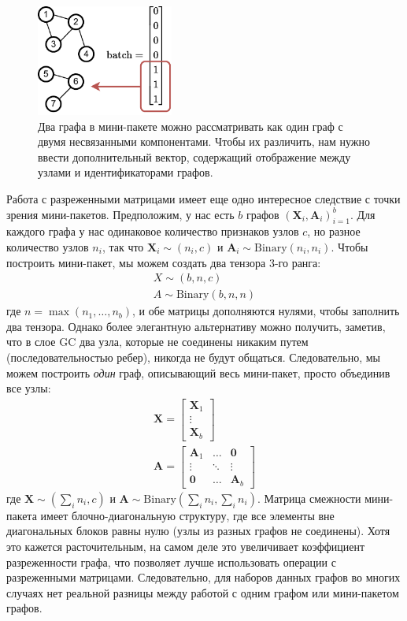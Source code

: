 \begin{figure}
    \centering
    \hspace{2em}\includegraphics[width=0.4\textwidth]{images/graphs-Page-4}
    \caption{Два графа в мини-пакете можно рассматривать как один граф с двумя несвязанными компонентами. Чтобы их различить, нам нужно ввести дополнительный вектор, содержащий отображение между узлами и идентификаторами графов.}
    \label{fig:graph_batch}
\end{figure}

Работа с разреженными матрицами имеет еще одно интересное следствие с точки зрения мини-пакетов. Предположим, у нас есть $b$ графов $(\mathbf{X}_i, \mathbf{A}_i)_{i=1}^b$. Для каждого графа у нас одинаковое количество признаков узлов $c$, но разное количество узлов $n_i$, так что $\mathbf{X}_i \sim (n_i, c)$ и $\mathbf{A}_i \sim \text{Binary}(n_i, n_i)$. Чтобы построить мини-пакет, мы можем создать два тензора 3-го ранга:
%
\begin{gather}
X \sim (b,n,c) \\A\sim \text{Binary}(b,n,n)
\end{gather}
%
где $n = \max(n_1, \ldots, n_b)$, и обе матрицы дополняются нулями, чтобы заполнить два тензора. Однако более элегантную альтернативу можно получить, заметив, что в слое GC два узла, которые не соединены никаким путем (последовательностью ребер), никогда не будут общаться. Следовательно, мы можем построить \textit{один} граф, описывающий весь мини-пакет, просто объединив все узлы:
%
\begin{gather}
\mathbf{X} = \begin{bmatrix}\mathbf{X}_1 \\ \vdots \\ \mathbf{X}_b \end{bmatrix} \\ \mathbf{A} = \begin{bmatrix} \mathbf{A}_1 & \ldots & \mathbf{0} \\ \vdots& \ddots & \vdots \\ \mathbf{0} & \ldots & \mathbf{A}_b \end{bmatrix}
\end{gather}
%
где $\mathbf{X} \sim (\sum_i n_i, c)$ и $\mathbf{A} \sim \text{Binary}(\sum_i n_i, \sum_i n_i)$. Матрица смежности мини-пакета имеет блочно-диагональную структуру, где все элементы вне диагональных блоков равны нулю (узлы из разных графов не соединены). Хотя это кажется расточительным, на самом деле это увеличивает коэффициент разреженности графа, что позволяет лучше использовать операции с разреженными матрицами. Следовательно, для наборов данных графов во многих случаях нет реальной разницы между работой с одним графом или мини-пакетом графов.

